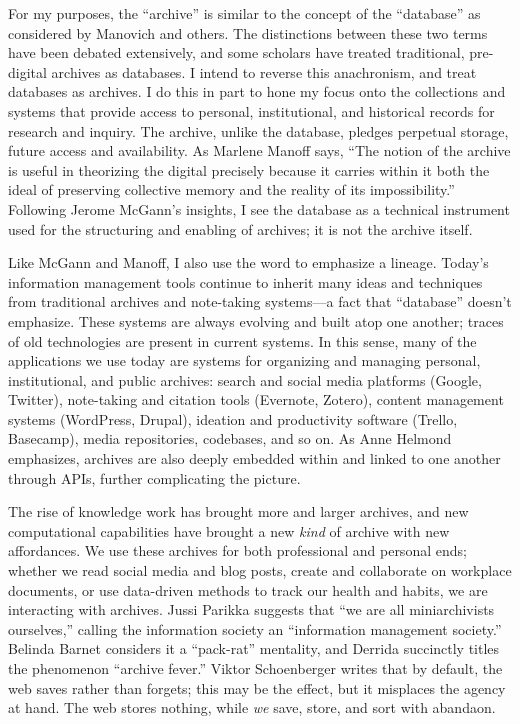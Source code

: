 For my purposes, the ``archive'' is similar to the concept of the ``database'' as considered by Manovich and others. The distinctions between these two terms have been debated extensively, and some scholars have treated traditional, pre-digital archives as databases.\autocite{manoff_archive_2010,freedman_responses_2007,barnet_pack-rat_2001} I intend to reverse this anachronism, and treat databases as archives. I do this in part to hone my focus onto the collections and systems that provide access to personal, institutional, and historical records for research and inquiry. The archive, unlike the database, pledges perpetual storage, future access and availability. As Marlene Manoff says, ``The notion of the archive is useful in theorizing the digital precisely because it carries within it both the ideal of preserving collective memory and the reality of its impossibility.''\autocite[396]{manoff_archive_2010} Following Jerome McGann's insights, I see the database as a technical instrument used for the structuring and enabling of archives; it is not the archive itself.\autocite[1588]{freedman_responses_2007}

Like McGann and Manoff, I also use the word to emphasize a lineage. Today's information management tools continue to inherit many ideas and techniques from traditional archives and note-taking systems---a fact that ``database'' doesn't emphasize. These systems are always evolving and built atop one another; traces of old technologies are present in current systems. In this sense, many of the applications we use today are systems for organizing and managing personal, institutional, and public archives: search and social media platforms (Google, Twitter), note-taking and citation tools (Evernote, Zotero), content management systems (WordPress, Drupal), ideation and productivity software (Trello, Basecamp), media repositories, codebases, and so on. As Anne Helmond emphasizes, archives are also deeply embedded within and linked to one another through APIs, further complicating the picture.\autocite{helmond_exploring_2013}

The rise of knowledge work has brought more and larger archives, and new computational capabilities have brought a new \emph{kind} of archive with new affordances. We use these archives for both professional and personal ends; whether we read social media and blog posts, create and collaborate on workplace documents, or use data-driven methods to track our health and habits, we are interacting with archives. Jussi Parikka suggests that ``we are all miniarchivists ourselves,'' calling the information society an ``information management society.''\autocite[2]{ernst_archival_2012} Belinda Barnet considers it a ``pack-rat'' mentality, and Derrida succinctly titles the phenomenon ``archive fever.''\autocite{barnet_pack-rat_2001,derrida_archive_1995} Viktor Schoenberger writes that by default, the web saves rather than forgets; this may be the effect, but it misplaces the agency at hand.\autocite{schoenberger_useful_2007} The web stores nothing, while \emph{we} save, store, and sort with abandaon.

